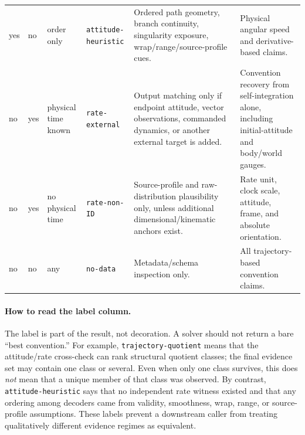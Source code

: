 \documentclass[11pt]{article}
\begin{document}
\begin{longtable}{@{}p{}p{}p{}p{}p{}p{}@{}}
        yes & no & order only
        & \texttt{attitude-heuristic}
        & Ordered path geometry, branch continuity, singularity exposure, wrap/range/source-profile cues.
        & Physical angular speed and derivative-based claims. \\
        no & yes & physical time known
        & \texttt{rate-external}
        & Output matching only if endpoint attitude, vector observations, commanded dynamics, or another external target is added.
        & Convention recovery from self-integration alone, including initial-attitude and body/world gauges. \\
        no & yes & no physical time
        & \texttt{rate-non-ID}
        & Source-profile and raw-distribution plausibility only, unless additional dimensional/kinematic anchors exist.
        & Rate unit, clock scale, attitude, frame, and absolute orientation. \\
        no & no & any
        & \texttt{no-data}
        & Metadata/schema inspection only.
        & All trajectory-based convention claims. \\
    \end{longtable}
    \endgroup

    \paragraph{How to read the label column.}
    The label is part of the result, not decoration. A solver should not return a bare
    ``best convention.'' For example, \texttt{trajectory-quotient} means that the
    attitude/rate cross-check can rank structural quotient classes; the final evidence set
    may contain one class or several. Even when only one class survives, this does \emph{not}
    mean that a unique member of that class was observed. By contrast,
    \texttt{attitude-heuristic} says that no independent rate witness existed and that
    any ordering among decoders came from validity, smoothness, wrap, range, or source-profile
    assumptions. These labels prevent a downstream caller from treating qualitatively
    different evidence regimes as equivalent.
\end{document}
